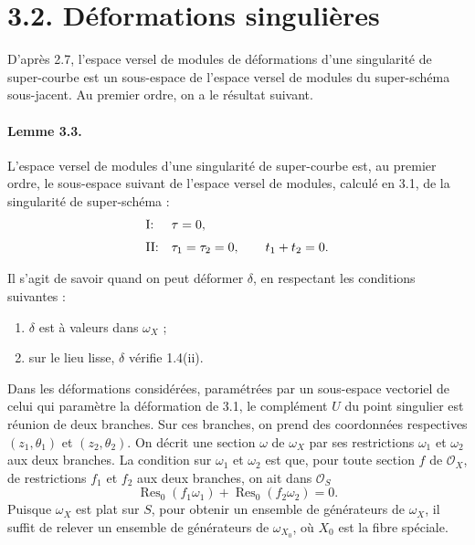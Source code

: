 \documentclass[11pt]{article}
\newcommand{\OO}{\mathcal O}
\newcommand{\res}{\operatorname{Res}}
\begin{document}
\section*{3.2. Déformations singulières}

D'après 2.7, l'espace versel de modules de déformations d'une singularité de super-courbe est un sous-espace de l'espace versel de modules du super-schéma sous-jacent. Au premier ordre, on a le résultat suivant.

\paragraph{Lemme 3.3.}
L'espace versel de modules d'une singularité de super-courbe est, au premier ordre, le sous-espace suivant de l'espace versel de modules, calculé en 3.1, de la singularité de super-schéma :
\[
\begin{array}{ll}
\text{\rm I:} & \tau=0,\\[2mm]
\text{\rm II:} & \tau_1=\tau_2=0,\qquad t_1+t_2=0 .
\end{array}
\]

Il s'agit de savoir quand on peut déformer $\delta$, en respectant les conditions suivantes :
\begin{enumerate}
\item[(a)] $\delta$ est à valeurs dans $\omega_X$ ;
\item[(b)] sur le lieu lisse, $\delta$ vérifie 1.4(ii).
\end{enumerate}

Dans les déformations considérées, paramétrées par un sous-espace vectoriel de celui qui paramètre la déformation de 3.1, le complément $U$ du point singulier est réunion de deux branches. Sur ces branches, on prend des coordonnées respectives $(z_1,\theta_1)$ et $(z_2,\theta_2)$. On décrit une section $\omega$ de $\omega_X$ par ses restrictions $\omega_1$ et $\omega_2$ aux deux branches. La condition sur $\omega_1$ et $\omega_2$ est que, pour toute section $f$ de $\OO_X$, de restrictions $f_1$ et $f_2$ aux deux branches, on ait dans $\OO_S$
\[
  \res_0(f_1\omega_1)+\res_0(f_2\omega_2)=0 .
\]
Puisque $\omega_X$ est plat sur $S$, pour obtenir un ensemble de générateurs de $\omega_X$, il suffit de relever un ensemble de générateurs de $\omega_{X_0}$, où $X_0$ est la fibre spéciale.
\end{document}

